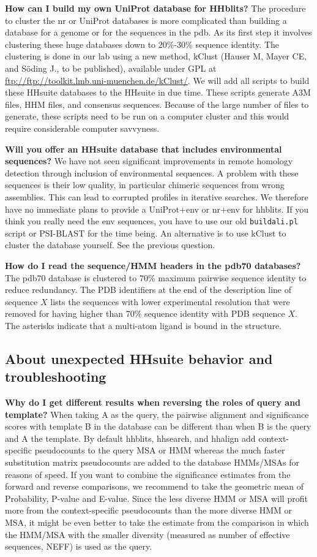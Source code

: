 \documentclass[11pt,a4paper]{article}
\begin{document}
{\bf How can I build my own UniProt database for HHblits?}
The procedure to cluster the nr or UniProt databases is more complicated than building a database for a genome or for the sequences in the pdb. As its first step it involves clustering these huge databases down to 20\%-30\% sequence identity. The clustering is done in our lab using a new method, kClust (Hauser M, Mayer CE, and S\"oding J., to be published), available under GPL at \url{ftp://ftp://toolkit.lmb.uni-muenchen.de/kClust/}. We will add all scripts to build these HHsuite databases to the HHsuite in due time. These scripts generate A3M files, HHM files, and consensus sequences. Because of the large number of files to generate, these scripts need to be run on a computer cluster and this would require considerable computer savvyness. 

{\bf Will you offer an HHsuite database that includes environmental sequences?}
We have not seen significant improvements in remote homology detection through inclusion of environmental sequences. A problem with these sequences is their low quality, in particular chimeric sequences from wrong assemblies. This can lead to corrupted profiles in iterative searches. We therefore have no immediate plans to provide a UniProt+env or nr+env for hhblits. If you think you really need the env sequences, you have to use our old \verb`buildali.pl` script or PSI-BLAST for the time being. An alternative is to use kClust to cluster the database yourself. See the previous question.

{\bf How do I read the sequence/HMM headers in the pdb70 databases?}
The pdb70 database is clustered to 70\% maximum pairwise sequence identity to reduce redundancy. The PDB identifiers at the end of the description line of sequence $X$ lists the sequences with lower experimental resolution that were removed for having higher than 70\% sequence identity with PDB sequence $X$. The asterisks indicate that a multi-atom ligand is bound in the structure. 


\subsection{About unexpected HHsuite behavior and troubleshooting}

{\bf Why do I get different results when reversing the roles of query and template?} When taking A as the query, the pairwise alignment and significance scores with template B in the database can be different than when B is the query and A the template. By default hhblits, hhsearch, and hhalign add context-specific pseudocounts to the query MSA or HMM whereas the much faster substitution matrix pseudocounts are added to the database HMMs/MSAs for reasons of speed. If you want to combine the significance estimates from the forward and reverse comparisons, we recommend to take the geometric mean of Probability, P-value and E-value. Since the less diverse HMM or MSA will profit more from the context-specific pseudocounts than the more diverse HMM or MSA, it might be even better to take the estimate from the comparison in which the HMM/MSA with the smaller diversity (measured as number of effective sequences, NEFF) is used as the query. 
\end{document}
